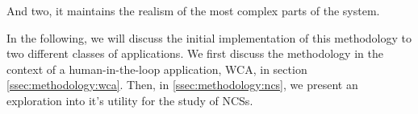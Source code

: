And two, it maintains the realism of the most complex parts of the system.


In the following, we will discuss the initial implementation of this methodology to two different classes of applications.
We first discuss the methodology in the context of a human-in-the-loop application, \gls{WCA}, in section \cref{ssec:methodology:wca}.
Then, in \cref{ssec:methodology:ncs}, we present an exploration into it's utility for the study of \glspl{NCS}.



